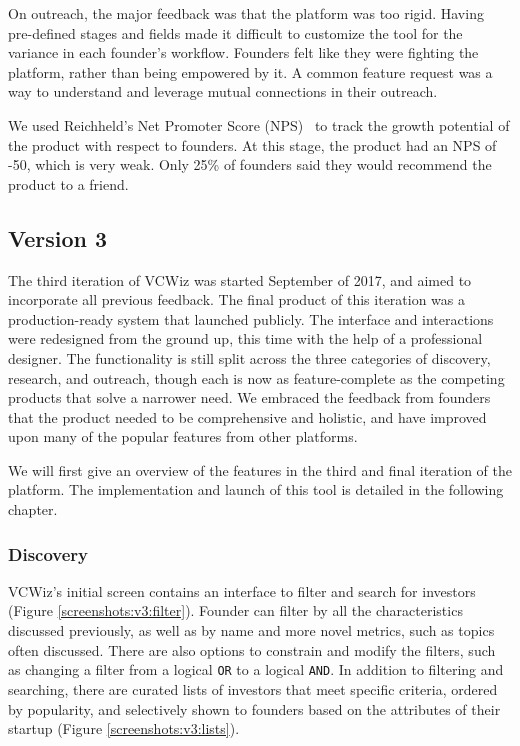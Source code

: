 On outreach, the major feedback was that the platform was too rigid. Having pre-defined stages and fields made it difficult to customize the tool for the variance in each founder's workflow. Founders felt like they were fighting the platform, rather than being empowered by it. A common feature request was a way to understand and leverage mutual connections in their outreach.

We used Reichheld's Net Promoter Score (NPS)~\cite{reichheld2003one} to track the growth potential of the product with respect to founders. At this stage, the product had an NPS of -50, which is very weak. Only 25\% of founders said they would recommend the product to a friend.

\subsection{Version 3}

The third iteration of VCWiz was started September of 2017, and aimed to incorporate all previous feedback. The final product of this iteration was a production-ready system that launched publicly. The interface and interactions were redesigned from the ground up, this time with the help of a professional designer. The functionality is still split across the three categories of discovery, research, and outreach, though each is now as feature-complete as the competing products that solve a narrower need. We embraced the feedback from founders that the product needed to be comprehensive and holistic, and have improved upon many of the popular features from other platforms.

We will first give an overview of the features in the third and final iteration of the platform. The implementation and launch of this tool is detailed in the following chapter.

\subsubsection{Discovery}

VCWiz's initial screen contains an interface to filter and search for investors (Figure \ref{screenshots:v3:filter}). Founder can filter by all the characteristics discussed previously, as well as by name and more novel metrics, such as topics often discussed. There are also options to constrain and modify the filters, such as changing a filter from a logical \texttt{OR} to a logical \texttt{AND}. In addition to filtering and searching, there are curated lists of investors that meet specific criteria, ordered by popularity, and selectively shown to founders based on the attributes of their startup (Figure \ref{screenshots:v3:lists}).

